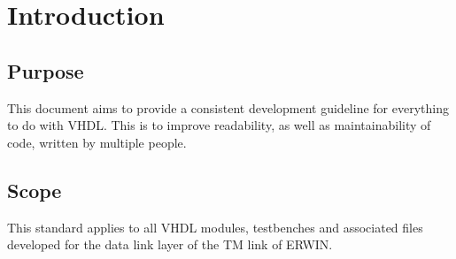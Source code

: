 \chapter{Introduction}	


\section{Purpose}
This document aims to provide a consistent development guideline for everything to do with VHDL. This is to improve readability, as well as maintainability of code, written by multiple people.

\section{Scope}
This standard applies to all VHDL modules, testbenches and associated files developed for the data link layer of the TM link of ERWIN. 

\newpage